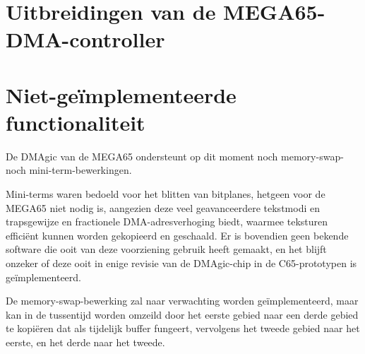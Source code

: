 \section{Uitbreidingen van de MEGA65-DMA-controller}



\section{Niet-geïmplementeerde functionaliteit}

De DMAgic van de MEGA65 ondersteunt op dit moment noch memory-swap- noch mini-term-bewerkingen.

Mini-terms waren bedoeld voor het blitten van bitplanes, hetgeen voor de MEGA65 niet nodig is, aangezien deze veel geavanceerdere tekstmodi en trapsgewijze en fractionele DMA-adresverhoging biedt, waarmee teksturen efficiënt kunnen worden gekopieerd en geschaald. Er is bovendien geen bekende software die ooit van deze voorziening gebruik heeft gemaakt, en het blijft onzeker of deze ooit in enige revisie van de DMAgic-chip in de C65-prototypen is geïmplementeerd.

De memory-swap-bewerking zal naar verwachting worden geïmplementeerd, maar kan in de tussentijd worden omzeild door het eerste gebied naar een derde gebied te kopiëren dat als tijdelijk buffer fungeert, vervolgens het tweede gebied naar het eerste, en het derde naar het tweede.
